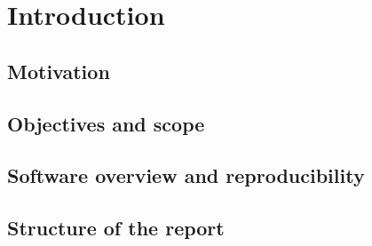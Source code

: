 \section{Introduction}\label{sec:introduction}

\subsection{Motivation}
\subsection{Objectives and scope}
\subsection{Software overview and reproducibility}
\subsection{Structure of the report}
